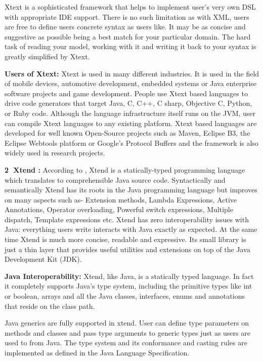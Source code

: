 	Xtext is a sophisticated framework that helps to implement user's very own DSL with appropriate IDE support. There is no such limitation as with XML, users are free to define users concrete syntax as users like. It may be as concise and suggestive as possible being a best match for your particular domain. The hard task of reading your model, working with it and writing it back to your syntax is greatly simplified by Xtext.
	
	\textbf{Users of Xtext:}
	Xtext is used in many different industries. It is used in the field of mobile devices, automotive development, embedded systems or Java enterprise software projects and game development. People use Xtext based languages to drive code generators that target Java, C, C++, C sharp, Objective C, Python, or Ruby code. Although the language infrastructure itself runs on the JVM, user can compile Xtext languages to any existing platform. Xtext based languages are developed for well known Open-Source projects such as Maven, Eclipse B3, the Eclipse Webtools platform or Google's Protocol Buffers and the framework is also widely used in research projects.
	
\textbf{\textcircled{2} Xtend :} According to \cite{ref_20_xtend}, Xtend is a statically-typed programming language which translates to comprehensible Java source code. Syntactically and semantically Xtend has its roots in the Java programming language but improves on many aspects such as- Extension methods, Lambda Expressions, Active Annotations, Operator overloading, Powerful switch expressions, Multiple dispatch, Template expressions etc. Xtend has zero interoperability issues with Java: everything users write interacts with Java exactly as expected. At the same time Xtend is much more concise, readable and expressive. Its small library is just a thin layer that provides useful utilities and extensions on top of the Java Development Kit (JDK). 
	
	\textbf{Java Interoperability:}
	Xtend, like Java, is a statically typed language. In fact it completely supports Java's type system, including the primitive types like int or boolean, arrays and all the Java classes, interfaces, enums and annotations that reside on the class path.
	
	Java generics are fully supported in xtend. User can define type parameters on methods and classes and pass type arguments to generic types just as users are used to from Java. The type system and its conformance and casting rules are implemented as defined in the Java Language Specification.
	
